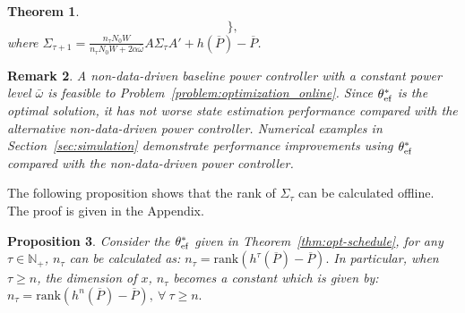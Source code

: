 \documentclass[twocolumn]{autart}    \usepackage{cite}
\newtheorem{theorem}{Theorem}[section]
\newtheorem{proposition}[theorem]{Proposition}
\newtheorem{remark}[theorem]{Remark}
\begin{document}
{{\begin{theorem}
$$\},$$
where $\Sigma_{\tau+1}=
\frac{n_\tau N_0W}{n_\tau N_0W+2\alpha
\bar \omega}A
\Sigma_{\tau}A'+h(\overline P)-\overline P$.
\end{theorem}
\begin{remark}\label{remark:better-performance}
{A non-data-driven baseline power controller
with a constant power level $\bar \omega$ is
feasible to
Problem~\ref{problem:optimization_online}. Since
$\theta_{\rm ef}^*$ is the optimal solution, it has not
worse state estimation performance
compared with the alternative non-data-driven
power controller. Numerical examples in
Section~\ref{sec:simulation} demonstrate performance improvements using
$\theta_{\rm ef}^*$ compared with the non-data-driven power controller.}
\end{remark}
The following proposition shows that the rank of $\Sigma_\tau$ can be calculated offline. The proof is given in the Appendix.
\begin{proposition}\label{proposition: rank}
Consider the $\theta_{\rm ef}^*$ given in Theorem~\ref{thm:opt-schedule},
for any $\tau\in\mathbb N_+$, $n_\tau$ can be calculated
as:
$n_\tau=\mathrm{rank}(h^\tau(\overline{P})-\overline{P}). $
In particular, when $\tau\geq n$, the dimension of $x$, $n_\tau$
becomes a constant which is given by:
$n_\tau=\mathrm{rank}(h^{n}(\overline{P})-\overline{P}),~\forall~
\tau\geq n.$
\end{proposition}

}}
\end{document}
